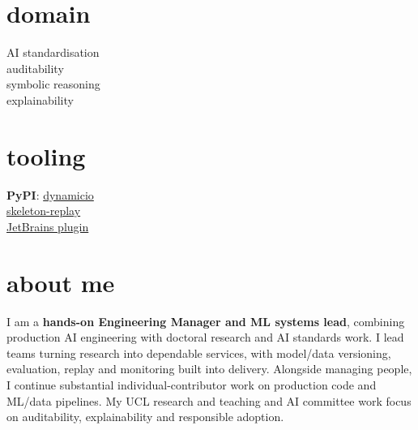 \documentclass[]{../../../../friggeri-cv}
\begin{document}
\begin{aside}
    \section{domain}
        {\footnotesize AI standardisation\\auditability\\symbolic reasoning\\explainability}
    \section{tooling}
        {\footnotesize \textbf{PyPI}: \href{https://pypi.org/project/dynamicio/}{dynamicio}\\\href{https://pypi.org/project/skeleton-replay/}{skeleton-replay}\\\href{https://plugins.jetbrains.com/plugin/32807-skeleton-replay}{JetBrains plugin}}
\end{aside}

\section{about me}
{\normalsize I am a \textbf{hands-on Engineering Manager and ML systems lead}, combining production AI engineering with doctoral research and AI standards work. I lead teams turning research into dependable services, with model/data versioning, evaluation, replay and monitoring built into delivery. Alongside managing people, I continue substantial individual-contributor work on production code and ML/data pipelines. My UCL research and teaching and AI committee work focus on auditability, explainability and responsible adoption.}
\end{document}
